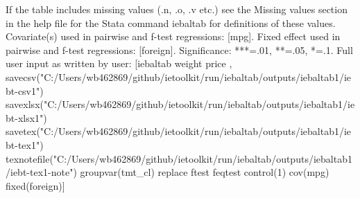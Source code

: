 If the table includes missing values (.n, .o, .v etc.) see the Missing values section in the help file for the Stata command iebaltab for definitions of these values. Covariate(s) used in pairwise and f-test regressions: [mpg]. Fixed effect used in pairwise and f-test regressions: [foreign]. Significance: ***=.01, **=.05, *=.1. Full user input as written by user: [iebaltab weight price , savecsv("C:/Users/wb462869/github/ietoolkit/run/iebaltab/outputs/iebaltab1/iebt-csv1") savexlsx("C:/Users/wb462869/github/ietoolkit/run/iebaltab/outputs/iebaltab1/iebt-xlsx1") savetex("C:/Users/wb462869/github/ietoolkit/run/iebaltab/outputs/iebaltab1/iebt-tex1") texnotefile("C:/Users/wb462869/github/ietoolkit/run/iebaltab/outputs/iebaltab1/iebt-tex1-note") groupvar(tmt\_cl) replace ftest feqtest control(1) cov(mpg) fixed(foreign)] 
